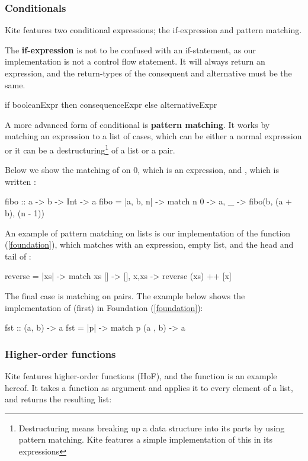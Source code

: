 \subsubsection{Conditionals}
\label{subsubsec:conditionals}
Kite features two conditional expressions; the if-expression and pattern matching.

The \textbf{if-expression} is not to be confused with an if-statement, as our implementation is not a control flow statement. It will always return an expression, and the return-types of the consequent and alternative must be the same.

\begin{kite}
if booleanExpr then consequenceExpr else alternativeExpr
\end{kite}

A more advanced form of conditional is \textbf{pattern matching}. It works by matching an expression to a list of cases, which can be either a normal expression or it can be a destructuring\footnote{Destructuring means breaking up a data structure into its parts by using pattern matching. Kite features a simple implementation of this in its  expressions} of a list or a pair.

Below we show the matching of  on 0, which is an expression, and , which is written :

\begin{kite}
fibo :: a -> b -> Int -> a
fibo = |a, b, n| -> {
  match n {
    0 -> a,
    _ -> fibo(b, (a + b), (n - 1))
  }
}
\end{kite}

An example of pattern matching on lists is our implementation of the function  (\ref{foundation}), which matches  with an expression, empty list, and the head and tail of :

\begin{kite}
reverse = |xs| -> {
  match xs {
    []    -> [],
    x,xs  -> reverse (xs) ++ [x]
  }
}
\end{kite}

The final case is matching on pairs. The example below shows the implementation of  (first) in Foundation (\ref{foundation}):
\begin{kite}
fst :: (a, b) -> a
fst = |p| -> {
  match p {
    (a , b) -> a
  }
}
\end{kite}

\subsubsection{Higher-order functions}
Kite features higher-order functions (HoF), and the  function is an example hereof. It takes a function as argument and applies it to every element of a list, and returns the resulting list:

